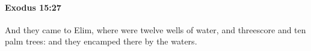 
		\paragraph{Exodus 15:27} %
			\label{EXODUS-15-27}

			And they came to Elim, where were twelve wells of water, and threescore and ten palm trees: and they encamped there by the waters.

